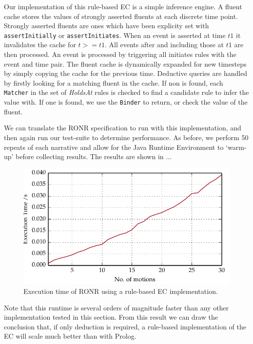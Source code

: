 Our implementation of this rule-based \ac{EC} is a simple inference
engine. A fluent cache stores the values of strongly asserted fluents at each
discrete time point. Strongly asserted fluents are ones which have been
explicity set with \texttt{assertInitially} or \texttt{assertInitiates}. When
an event is asserted at time $\mathit{t1}$ it invalidates the cache for $t >= \mathit{t1}$. All
events after and including those at $\mathit{t1}$ are then processed. An event is
processed by triggering all initiates rules with the event and time pair. The
fluent cache is dynamically expanded for new timesteps by simply copying the
cache for the previous time. Deductive queries are handled by firstly looking
for a matching fluent in the cache. If non is found, each \texttt{Matcher} in
the set of \emph{HoldsAt} rules is checked to find a candidate rule to infer the value
with. If one is found, we use the \texttt{Binder} to return, or check the value
of the fluent.

We can translate the \ac{RONR} specification to run with this implementation,
and then again run our test-suite to determine performance. As before, we
perform 50 repeats of each narrative and allow for the Java Runtime
Environment to `warm-up' before collecting results. The results are shown in ...

\begin{figure}
\centering
\caption{Execution time of RONR using a rule-based EC implementation.}\label{fig:rulec}
\includegraphics{gfx/ec/rulebased}
\end{figure}


Note that this runtime is several orders of magnitude faster than any other
implementation tested in this section. From this result we can draw the
conclusion that, if only deduction is required, a rule-based implementation of
the \ac{EC} will scale much better than with Prolog.

